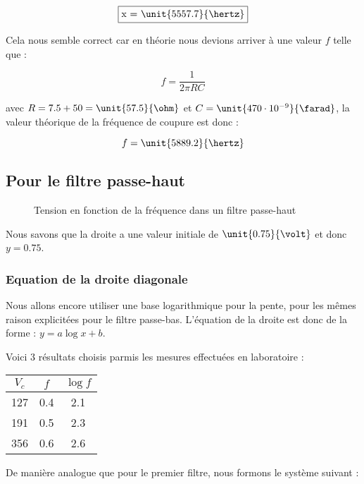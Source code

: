 $$\fbox{x = \unit{5557.7}{\hertz}}$$ 

Cela nous semble correct car en théorie nous devions arriver à une valeur $f$ telle que : 

$$f=\frac{1}{2\pi RC}$$

avec $R= 7.5 + 50 = \unit{57.5}{\ohm}$ et $C= \unit{470 \cdot 10^{-9}}{\farad}$, la valeur théorique de la fréquence de coupure est donc :

$$f= \unit{5889.2}{\hertz}$$

\subsection{Pour le filtre passe-haut}

\begin{figure}[h]
   \centering
   
   \caption{\label{premierebissectrice}Tension en fonction de la fréquence dans un filtre passe-haut}
\end{figure}



Nous savons que la droite a une valeur initiale de $\unit{0.75}{\volt}$ et donc $y = 0.75$.

\subsubsection{Equation de la droite diagonale}

Nous allons encore utiliser une base logarithmique pour la pente, pour les mêmes raison explicitées pour le filtre passe-bas. 
L'équation de la droite est donc de la forme : $y=a\log{x}+b$.

Voici 3 résultats choisis parmis les mesures effectuées en laboratoire :

\begin{center}
	\begin{tabular}{|c|c|c|}
		\hline
		$V_c$ & $f$ & $\log{f}$ \\
		\hline
		127 & 0.4 & 2.1\\
		\hline
		191 & 0.5 & 2.3\\
		\hline
		356 & 0.6 & 2.6 \\
		\hline
	\end{tabular}
\end{center}

De manière analogue que pour le premier filtre, nous formons le système suivant :

